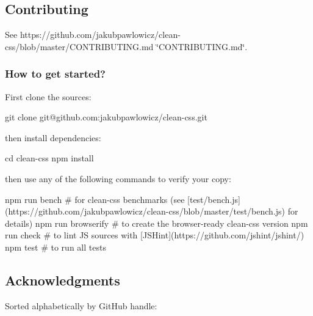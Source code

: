 \subsection*{Contributing}

See https\+://github.com/jakubpawlowicz/clean-\/css/blob/master/\+C\+O\+N\+T\+R\+I\+B\+U\+T\+I\+N\+G.\+md \char`\"{}\+C\+O\+N\+T\+R\+I\+B\+U\+T\+I\+N\+G.\+md\char`\"{}.

\subsubsection*{How to get started?}

First clone the sources\+:


\begin{DoxyCode}
git clone git@github.com:jakubpawlowicz/clean-css.git
\end{DoxyCode}


then install dependencies\+:


\begin{DoxyCode}
cd clean-css
npm install
\end{DoxyCode}


then use any of the following commands to verify your copy\+:


\begin{DoxyCode}
npm run bench # for clean-css benchmarks (see
       [test/bench.js](https://github.com/jakubpawlowicz/clean-css/blob/master/test/bench.js) for details)
npm run browserify # to create the browser-ready clean-css version
npm run check # to lint JS sources with [JSHint](https://github.com/jshint/jshint/)
npm test # to run all tests
\end{DoxyCode}


\subsection*{Acknowledgments}

Sorted alphabetically by Git\+Hub handle\+:


